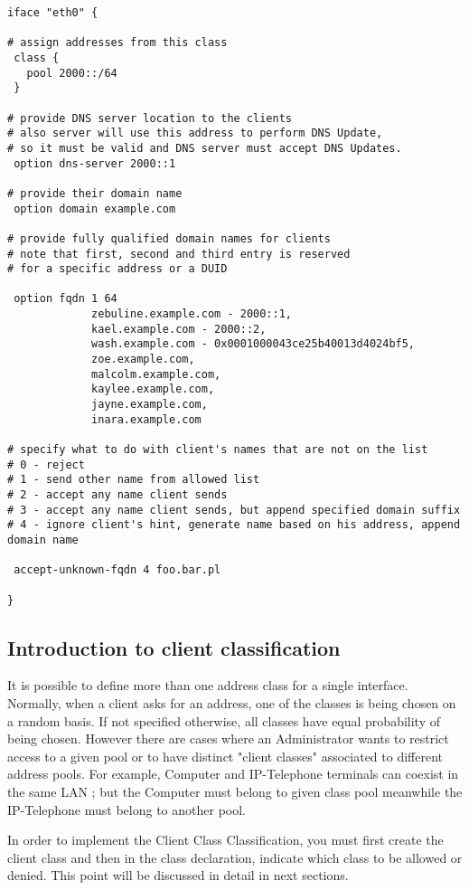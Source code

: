 \begin{lstlisting}
iface "eth0" {

# assign addresses from this class
 class {
   pool 2000::/64
 }

# provide DNS server location to the clients
# also server will use this address to perform DNS Update,
# so it must be valid and DNS server must accept DNS Updates.
 option dns-server 2000::1

# provide their domain name
 option domain example.com

# provide fully qualified domain names for clients
# note that first, second and third entry is reserved
# for a specific address or a DUID

 option fqdn 1 64
             zebuline.example.com - 2000::1,
             kael.example.com - 2000::2,
             wash.example.com - 0x0001000043ce25b40013d4024bf5,
             zoe.example.com,
             malcolm.example.com,
             kaylee.example.com,
             jayne.example.com,
             inara.example.com

# specify what to do with client's names that are not on the list
# 0 - reject
# 1 - send other name from allowed list
# 2 - accept any name client sends
# 3 - accept any name client sends, but append specified domain suffix
# 4 - ignore client's hint, generate name based on his address, append domain name

 accept-unknown-fqdn 4 foo.bar.pl

}
\end{lstlisting}

\subsection{Introduction to client classification}
\label{feature-client-class}
It is possible to define more than one address class for a single
interface. Normally, when a client asks for an address, one of the
classes is being chosen on a random basis. If not specified otherwise,
all classes have equal probability of being chosen. However there are
cases where an Administrator wants to restrict access to a given pool
or to have distinct "client classes" associated to different address
pools. For example, Computer and IP-Telephone terminals can coexist in
the same LAN ; but the Computer must belong to given class pool
meanwhile the IP-Telephone must belong to another pool.

In order to implement the Client Class Classification, you must first
create the client class and then in the class declaration, indicate
which class to be allowed or denied. This point will be discussed in
detail in next sections.

